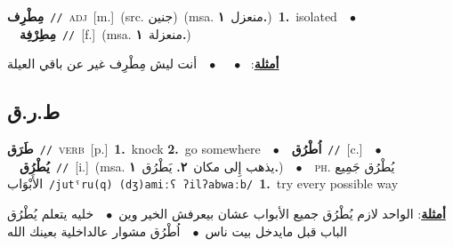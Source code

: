 \documentclass[10pt,a4paper,twoside]{article} %
\begin{document}
\begin{multicols}{2}
{\setlength\topsep{0pt}\textbf{\foreignlanguage{arabic}{مِطْرِف}}\ {\color{gray}\texttt{//}\color{black}}\ \textsc{adj}\ [m.]\ (src. \color{gray}\foreignlanguage{arabic}{جنين}\color{black})\ \color{gray}(msa. \foreignlanguage{arabic}{منعزل}~\foreignlanguage{arabic}{\textbf{١.}})\color{black}\ \textbf{1.}~isolated\ \ $\bullet$\ \ \setlength\topsep{0pt}\textbf{\foreignlanguage{arabic}{مِطِرْفِة}}\ {\color{gray}\texttt{//}\color{black}}\ [f.]\ \color{gray}(msa. \foreignlanguage{arabic}{منعزلة}~\foreignlanguage{arabic}{\textbf{١.}})\color{black}\  \begin{flushright}\color{gray}\foreignlanguage{arabic}{\textbf{\underline{\foreignlanguage{arabic}{أمثلة}}}: \ $\bullet$\ \  \ $\bullet$\ \  أنت ليش مِطْرِف غير عن باقي العيلة}\end{flushright}\color{black}} \vspace{2mm}

\vspace{-3mm}
\subsection*{\color{blue}\foreignlanguage{arabic}{ط.ر.ق}\color{blue}{}} 

{\setlength\topsep{0pt}\textbf{\foreignlanguage{arabic}{طَرَق}}\ {\color{gray}\texttt{//}\color{black}}\ \textsc{verb}\ [p.]\ \textbf{1.}~knock  \textbf{2.}~go somewhere\ \ $\bullet$\ \ \setlength\topsep{0pt}\textbf{\foreignlanguage{arabic}{اُطْرُق}}\ {\color{gray}\texttt{//}\color{black}}\ [c.]\ \ $\bullet$\ \ \setlength\topsep{0pt}\textbf{\foreignlanguage{arabic}{يُطْرُق}}\ {\color{gray}\texttt{//}\color{black}}\ [i.]\ \color{gray}(msa. \foreignlanguage{arabic}{يذهب إِلى مكان}~\foreignlanguage{arabic}{\textbf{٢.}}  \foreignlanguage{arabic}{يَطْرُق}~\foreignlanguage{arabic}{\textbf{١.}})\color{black}\ \ $\bullet$\ \ \textsc{ph.} \color{gray} \foreignlanguage{arabic}{يُطْرُق جَمِيع الأَبْوَاب}\color{black}\ {\color{gray}\texttt{/{\sffamily jutˤru(q) (dʒ)amiːʕ ʔilʔabwaːb}/}\color{black}}\ \textbf{1.}~try every possible way\  \begin{flushright}\color{gray}\foreignlanguage{arabic}{\textbf{\underline{\foreignlanguage{arabic}{أمثلة}}}: الواحد لازم يُطْرُق جميع الأبواب عشان بيعرفش الخير وين\ $\bullet$\ \  خليه يتعلم يُطْرُق الباب قبل مايدخل بيت ناس\ $\bullet$\ \  اُطْرُق مشوار عالداخلية بعينك الله}\end{flushright}\color{black}} \vspace{2mm}


\end{multicols}
\end{document}
